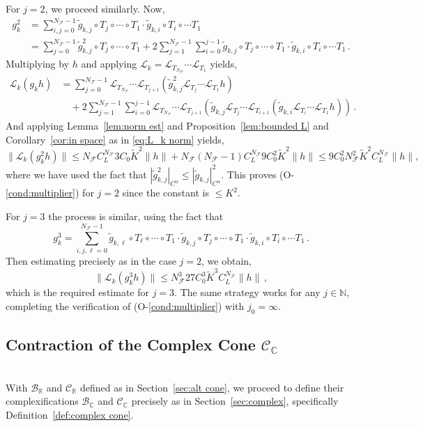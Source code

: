 \documentclass{amsart}
\numberwithin{equation}{section}
\newcommand\cB{{\mathcal B}}
\newcommand\cC{{\mathcal C}}
\newcommand\cF{{\mathcal F}}
\newcommand\cL{{\mathcal L}}
\newcommand\bC{{\mathbb C}}
\newcommand\bN{{\mathbb N}}
\newcommand\bR{{\mathbb R}}
\begin{document}
For $j=2$, we proceed similarly.  Now,
\[
\begin{split}
g_k^2 & = \sum_{i,j=0}^{N_\cF-1} \tilde g_{k,j} \circ T_j \circ \cdots \circ T_1 \cdot \tilde g_{k,i} \circ T_i \circ \cdots T_1 \\
& = \sum_{j=0}^{N_\cF-1} \tilde g_{k,j}^2 \circ T_j \circ \cdots \circ T_1 + 2 \sum_{j=1}^{N_\cF-1} \sum_{i=0}^{j-1}
\tilde g_{k,j} \circ T_j \circ \cdots \circ T_1 \cdot \tilde g_{k,i} \circ T_i \circ \cdots T_1 \, .
\end{split}
\]
Multiplying by $h$ and applying $\cL_k = \cL_{T_{N_\cF}} \cdots \cL_{T_1}$ yields,
\[
\begin{split}
\cL_k(g_k h) & =  \sum_{j=0}^{N_\cF-1} \cL_{T_{N_\cF}} \cdots \cL_{T_{j+1}} ( \tilde g_{k,j}^2 \cL_{T_j} \cdots \cL_{T_1} h) \\
& \quad + 2 \sum_{j=1}^{N_\cF-1} \sum_{i=0}^{j-1}
\cL_{T_{N_\cF}} \cdots \cL_{T_{j+1}} ( \tilde g_{k,j} \cL_{T_j} \cdots \cL_{T_{i+1}} ( \tilde g_{k,i} \cL_{T_i} \cdots \cL_{T_1} h)) \, .
\end{split}
\]
And applying Lemma~\ref{lem:norm est} and Proposition~\ref{lem:bounded L} and Corollary~\ref{cor:in space} as in
\eqref{eq:L_k norm} yields,
\[
\| \cL_k(g_k^2 h) \| \le N_\cF C_L^{N_\cF} 3C_0 \tilde K^2 \| h \| + N_{\cF}(N_\cF-1) C_L^{N_\cF} 9C_0^2 \tilde K^2 \| h \| 
\le 9 C_0^2 N_\cF^2 \tilde K^2 C_L^{N_\cF} \| h \| ,
\]
where we have used the fact that $| \tilde g_{k,j}^2 |_{C^\alpha} \le |\tilde g_{k,j} |_{C^\alpha}^2$.
This proves (O-\ref{cond:multiplier}) for $j=2$ since the constant is $\le K^2$.

For $j = 3$ the process is similar, using the fact that
\[
g_k^3 = \sum_{i,j,\ell=0}^{N_\cF-1}  \tilde g_{k,\ell} \circ T_\ell \circ \cdots \circ T_1 \cdot \tilde g_{k,j} \circ T_j \circ \cdots \circ T_1 \cdot \tilde g_{k,i} \circ T_i \circ \cdots T_1 \, .
\]
Then estimating precisely as in the case $j=2$, we obtain,
\[
\| \cL_k(g_k^3 h) \| \le N_\cF^3 27 C_0^3 \tilde K^3 C_L^{N_\cF} \| h\| \, ,
\]
which is the required estimate for $j=3$.  The same strategy works for any $j \in \bN$, completing the verification
of (O-\ref{cond:multiplier}) with $j_0 = \infty$.


\subsection{Contraction of the Complex Cone $\cC_{\bC}$}\ \\
\label{sec:cone contract}
With $\cB_{\bR}$ and $\cC_{\bR}$ defined as in Section~\ref{sec:alt cone}, we proceed to define
their complexifications $\cB_{\bC}$ and $\cC_{\bC}$ precisely as in Section~\ref{sec:complex},
specifically Definition~\ref{def:complex cone}.
\end{document}
